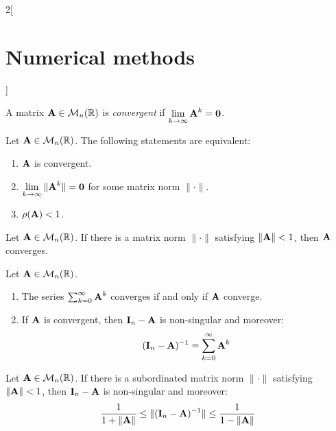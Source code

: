 \documentclass[../../../main_math.tex]{subfiles}
\begin{document}
\begin{multicols}{2}[\section{Numerical methods}]
\begin{proposition}
  \end{proposition}
  \begin{definition}
    A matrix $\boldsymbol{\mathrm{A}}\in\mathcal{M}_n(\mathbb{R})$ is \emph{convergent} if $\displaystyle\lim_{k\to\infty}\boldsymbol{\mathrm{A}}^k=\boldsymbol{\mathrm{0}}$.
  \end{definition}
  \begin{theorem}
    Let $\boldsymbol{\mathrm{A}}\in\mathcal{M}_n(\mathbb{R})$. The following statements are equivalent:
    \begin{enumerate}
      \item $\boldsymbol{\mathrm{A}}$ is convergent.
      \item $\displaystyle\lim_{k\to\infty}\|\boldsymbol{\mathrm{A}}^k\|=\boldsymbol{\mathrm{0}}$ for some matrix norm $\|\cdot\|$.
      \item $\rho(\boldsymbol{\mathrm{A}})<1$.
    \end{enumerate}
  \end{theorem}
  \begin{corollary}
    Let $\boldsymbol{\mathrm{A}}\in\mathcal{M}_n(\mathbb{R})$. If there is a matrix norm $\|\cdot\|$ satisfying $\|\boldsymbol{\mathrm{A}}\|<1$, then $\boldsymbol{\mathrm{A}}$ converges.
  \end{corollary}
  \begin{theorem}
    Let $\boldsymbol{\mathrm{A}}\in\mathcal{M}_n(\mathbb{R})$.
    \begin{enumerate}
      \item The series $\sum_{k=0}^\infty \boldsymbol{\mathrm{A}}^k$ converges if and only if $\boldsymbol{\mathrm{A}}$ converge.
      \item If $\boldsymbol{\mathrm{A}}$ is convergent, then $\boldsymbol{\mathrm{I}}_n-\boldsymbol{\mathrm{A}}$ is non-singular and moreover: $$(\boldsymbol{\mathrm{I}}_n-\boldsymbol{\mathrm{A}})^{-1}=\sum_{k=0}^\infty\boldsymbol{\mathrm{A}}^k$$
    \end{enumerate}
  \end{theorem}
  \begin{corollary}
    Let $\boldsymbol{\mathrm{A}}\in\mathcal{M}_n(\mathbb{R})$. If there is a subordinated matrix norm $\|\cdot\|$ satisfying $\|\boldsymbol{\mathrm{A}}\|<1$, then $\boldsymbol{\mathrm{I}}_n-\boldsymbol{\mathrm{A}}$ is non-singular and moreover: $$\frac{1}{1+\|\boldsymbol{\mathrm{A}}\|}\leq\|(\boldsymbol{\mathrm{I}}_n-\boldsymbol{\mathrm{A}})^{-1}\|\leq\frac{1}{1-\|\boldsymbol{\mathrm{A}}\|}$$
  \end{corollary}

\end{multicols}
\end{document}
